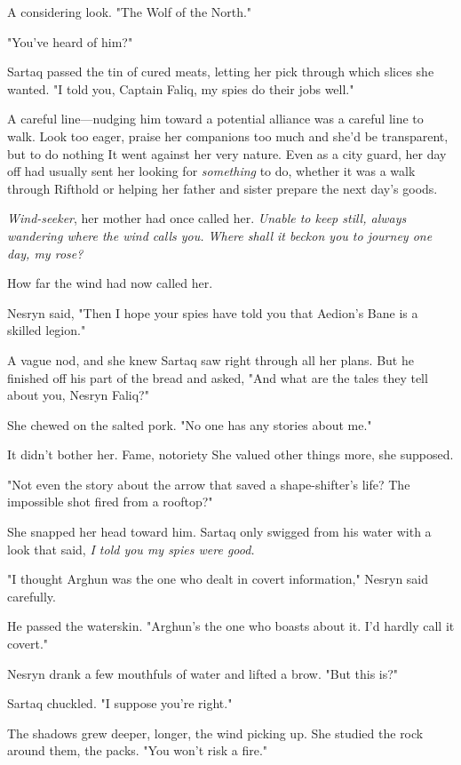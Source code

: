 A considering look. "The Wolf of the North."

"You've heard of him?"

Sartaq passed the tin of cured meats, letting her pick through which slices she wanted. "I told you, Captain Faliq, my spies do their jobs well."

A careful line---nudging him toward a potential alliance was a careful line to walk. Look too eager, praise her companions too much and she'd be transparent, but to do nothing  It went against her very nature. Even as a city guard, her day off had usually sent her looking for \emph{something} to do, whether it was a walk through Rifthold or helping her father and sister prepare the next day's goods.

\emph{Wind-seeker}, her mother had once called her. \emph{Unable to keep still, always wandering where the wind calls you. Where shall it beckon you to journey one day, my rose?}

How far the wind had now called her.

Nesryn said, "Then I hope your spies have told you that Aedion's Bane is a skilled legion."

A vague nod, and she knew Sartaq saw right through all her plans. But he finished off his part of the bread and asked, "And what are the tales they tell about you, Nesryn Faliq?"

She chewed on the salted pork. "No one has any stories about me."

It didn't bother her. Fame, notoriety  She valued other things more, she supposed.

"Not even the story about the arrow that saved a shape-shifter's life? The impossible shot fired from a rooftop?"

She snapped her head toward him. Sartaq only swigged from his water with a look that said, \emph{I told you my spies were good.}

"I thought Arghun was the one who dealt in covert information," Nesryn said carefully.

He passed the waterskin. "Arghun's the one who boasts about it. I'd hardly call it covert."

Nesryn drank a few mouthfuls of water and lifted a brow. "But this is?"

Sartaq chuckled. "I suppose you're right."

The shadows grew deeper, longer, the wind picking up. She studied the rock around them, the packs. "You won't risk a fire."

